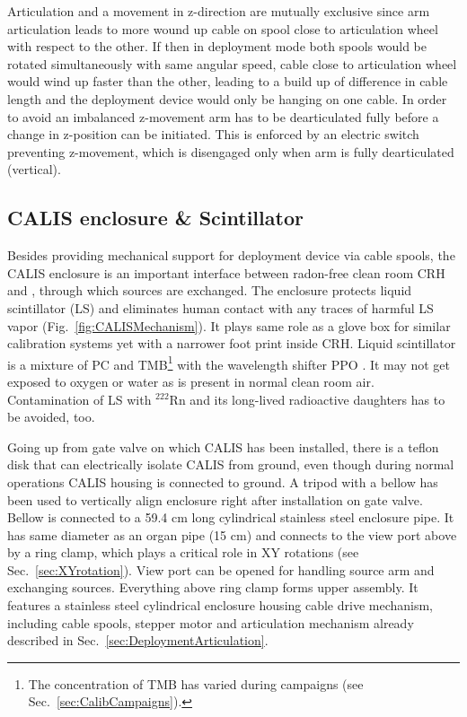 Articulation and a movement in z-direction are mutually exclusive since arm articulation leads to more wound up cable on spool close to articulation wheel with respect to the other. If then in deployment mode both spools would be rotated simultaneously with same angular speed, cable close to articulation wheel would wind up faster than the other, leading to a build up of difference in cable length and the deployment device would only be hanging on one cable. In order to avoid an imbalanced z-movement arm has to be dearticulated fully before a change in z-position can be initiated. This is enforced by an electric switch preventing z-movement, which is disengaged only when arm is fully dearticulated (vertical). 


\subsection{CALIS enclosure \& Scintillator}

Besides providing mechanical support for deployment device via cable spools, the CALIS enclosure is an important interface between radon-free clean room CRH and \lsv, through which sources are exchanged. 
The enclosure protects liquid scintillator (LS) and eliminates human contact with any traces of harmful LS vapor (Fig.~\ref{fig:CALISMechanism}). It plays same role as a glove box for similar calibration systems yet with a narrower foot print inside CRH. Liquid scintillator is a mixture of PC and TMB\footnote{The concentration of TMB has varied during campaigns (see Sec.~\ref{sec:CalibCampaigns}).} with the wavelength shifter PPO \cite{Agnes:2015qyz}. %
It may not get exposed to oxygen or water as is present in normal clean room air. Contamination of LS with $^{222}$Rn and its long-lived radioactive daughters has to be avoided, too. 

Going up from gate valve on which CALIS has been installed, there is a teflon disk that can electrically isolate CALIS from ground, even though during normal operations CALIS housing is connected to ground. A tripod with a bellow has been used to vertically align enclosure right after installation on gate valve. Bellow is connected to a 59.4 cm long cylindrical stainless steel enclosure pipe. It has same diameter as an organ pipe (15 cm) and connects to the view port above by a ring clamp, which plays a critical role in XY rotations (see Sec.~\ref{sec:XYrotation}). View port can be opened for handling source arm and exchanging sources. Everything above ring clamp forms upper assembly. It features a stainless steel cylindrical enclosure housing cable drive mechanism, including cable spools, stepper motor and articulation mechanism already described in Sec.~\ref{sec:DeploymentArticulation}. 

